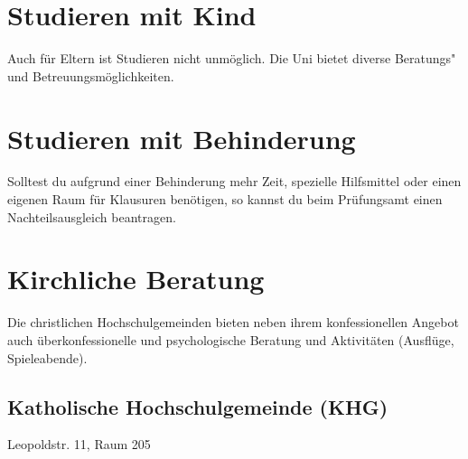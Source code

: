 \begin{urlList}
\end{urlList}

\section{Studieren mit Kind}

Auch für Eltern ist Studieren nicht unmöglich. Die Uni bietet diverse Beratungs"~ und Betreuungsmöglichkeiten.

\begin{urlList}
\end{urlList}

\section{Studieren mit Behinderung}

Solltest du aufgrund einer Behinderung mehr Zeit, spezielle Hilfsmittel oder einen eigenen Raum für Klausuren benötigen, so kannst du beim Prüfungsamt einen Nachteilsausgleich beantragen.

\begin{urlList}
\end{urlList}



\section{Kirchliche Beratung}
Die christlichen Hochschulgemeinden bieten neben ihrem konfessionellen Angebot auch überkonfessionelle und psychologische Beratung und Aktivitäten (Ausflüge, Spieleabende).
\newpage
\subsection*{Katholische Hochschulgemeinde (KHG)}
Leopoldstr. 11, Raum 205

\begin{urlList}
\end{urlList}

